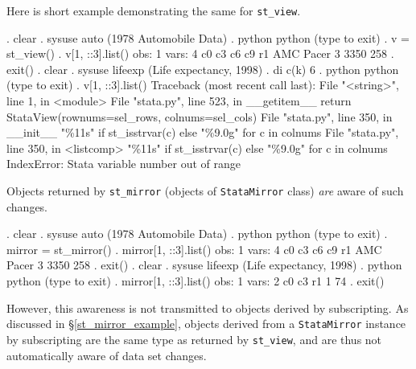 \documentclass{article}
\begin{document}
Here is short example demonstrating the same for \lstinline{st_view}.

\begin{stlog}
. clear
{\smallskip}
. sysuse auto
(1978 Automobile Data)
{\smallskip}
. python
 python (type {} to exit) 
{\bftt{>>>}}. v = st_view()
{\smallskip}
{\bftt{>>>}}. v[1, ::3].list()
{\smallskip}
  obs: 1
 vars: 4
{\smallskip}
            c0        c3        c6        c9
r1   AMC Pacer         3      3350       258
{\smallskip}
{\bftt{>>>}}. exit()
{\smallskip}
. clear
{\smallskip}
. sysuse lifeexp
(Life expectancy, 1998)
{\smallskip}
. di c(k)
6
{\smallskip}
. python
 python (type {} to exit) 
{\bftt{>>>}}. v[1, ::3].list()
{\color{red}Traceback (most recent call last):
  File "<string>", line 1, in <module>
  File "stata.py", line 523, in __getitem__
    return StataView(rownums=sel_rows, colnums=sel_cols)
  File "stata.py", line 350, in __init__
    "\%11s" if st_isstrvar(c) else "\%9.0g" for c in colnums
  File "stata.py", line 350, in <listcomp>
    "\%11s" if st_isstrvar(c) else "\%9.0g" for c in colnums
IndexError: Stata variable number out of range}
\end{stlog}

\medskip

Objects returned by \lstinline{st_mirror} (objects of \lstinline$StataMirror$ class) \emph{are} aware of such changes.

\begin{stlog}
. clear
{\smallskip}
. sysuse auto
(1978 Automobile Data)
{\smallskip}
. python
 python (type {} to exit) 
{\bftt{>>>}}. mirror = st_mirror()
{\smallskip}
{\bftt{>>>}}. mirror[1, ::3].list()
{\smallskip}
  obs: 1
 vars: 4
{\smallskip}
            c0        c3        c6        c9
r1   AMC Pacer         3      3350       258
{\smallskip}
{\bftt{>>>}}. exit()
{\smallskip}
. clear
{\smallskip}
. sysuse lifeexp
(Life expectancy, 1998)
{\smallskip}
. python
 python (type {} to exit) 
{\bftt{>>>}}. mirror[1, ::3].list()
{\smallskip}
  obs: 1
 vars: 2
{\smallskip}
          c0        c3
r1         1        74
{\smallskip}
{\bftt{>>>}}. exit()
\end{stlog}

\medskip

However, this awareness is not transmitted to objects derived by subscripting. As discussed in \S\ref{st_mirror_example}, objects derived from a \lstinline$StataMirror$ instance by subscripting are the same type as returned by \lstinline{st_view}, and are thus not automatically aware of data set changes.
\end{document}
